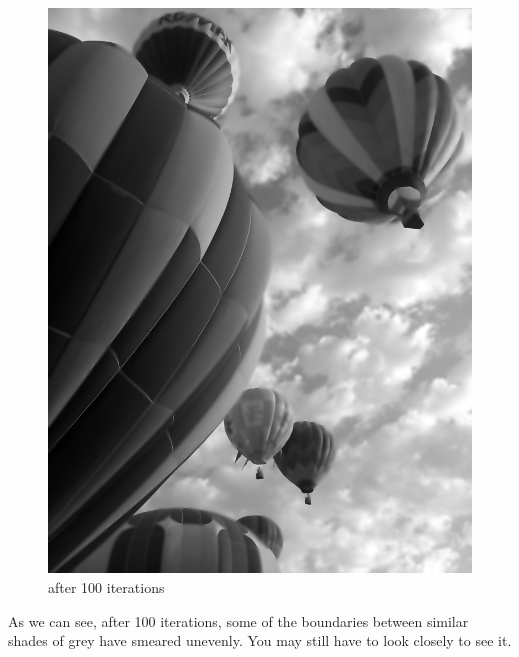 \begin{figure}[ht]
\begin{minipage}[b]{0.45\linewidth}
\includegraphics[width=\textwidth]{baloons100}
\caption*{after 100 iterations}
\end{minipage}
\end{figure}

As we can see, after 100 iterations, some of the boundaries between similar shades of grey have smeared unevenly. You may still have to look closely to see it.

